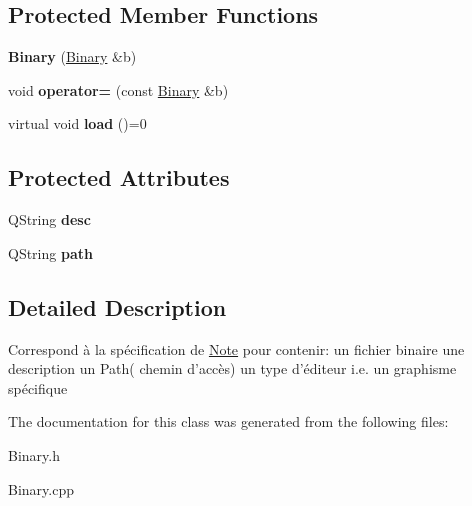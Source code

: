 \subsection*{\-Protected \-Member \-Functions}
\begin{DoxyCompactItemize}
\item 
\hypertarget{classBinary_a91c7ab94c9a90378d050c647a3b828ae}{{\bfseries \-Binary} (\hyperlink{classBinary}{\-Binary} \&b)}\label{classBinary_a91c7ab94c9a90378d050c647a3b828ae}

\item 
\hypertarget{classBinary_a63012d4e15470cc40cced167575be9b7}{void {\bfseries operator=} (const \hyperlink{classBinary}{\-Binary} \&b)}\label{classBinary_a63012d4e15470cc40cced167575be9b7}

\item 
\hypertarget{classBinary_a20cf14022913ce26fbb3b0fd59c7fccf}{virtual void {\bfseries load} ()=0}\label{classBinary_a20cf14022913ce26fbb3b0fd59c7fccf}

\end{DoxyCompactItemize}
\subsection*{\-Protected \-Attributes}
\begin{DoxyCompactItemize}
\item 
\hypertarget{classBinary_ac1f3c9e3488d40f6d08be99f33a537db}{\-Q\-String {\bfseries desc}}\label{classBinary_ac1f3c9e3488d40f6d08be99f33a537db}

\item 
\hypertarget{classBinary_ae7a554907a63301507ee154ddaed9d56}{\-Q\-String {\bfseries path}}\label{classBinary_ae7a554907a63301507ee154ddaed9d56}

\end{DoxyCompactItemize}


\subsection{\-Detailed \-Description}
\-Correspond à la spécification de \hyperlink{classNote}{\-Note} pour contenir\-: un fichier binaire une description un \-Path( chemin d'accès) un type d'éditeur i.\-e. un graphisme spécifique 

\-The documentation for this class was generated from the following files\-:\begin{DoxyCompactItemize}
\item 
\-Binary.\-h\item 
\-Binary.\-cpp\end{DoxyCompactItemize}
